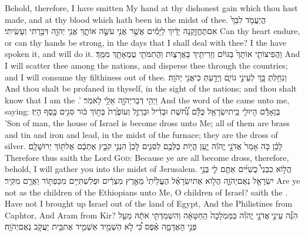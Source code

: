 {Behold, therefore, I have smitten My hand at thy dishonest gain which thou hast made, and at thy blood which hath been in the midst of thee.}
{הֲיַעֲמֹ֤ד לִבֵּךְ֙ אִם\maqqaf תֶּחֱזַ֣קְנָה יָדַ֔יִךְ לַיָּמִ֕ים אֲשֶׁ֥ר אֲנִ֖י עֹשֶׂ֣ה אוֹתָ֑ךְ אֲנִ֥י יְהֹוָ֖ה דִּבַּ֥רְתִּי וְעָשִֽׂיתִי׃}
{Can thy heart endure, or can thy hands be strong, in the days that I shall deal with thee? I the \lord\space have spoken it, and will do it.}
{וַהֲפִיצוֹתִ֤י אוֹתָךְ֙ בַּגּוֹיִ֔ם וְזֵרִיתִ֖יךְ בָּאֲרָצ֑וֹת וַהֲתִמֹּתִ֥י טֻמְאָתֵ֖ךְ מִמֵּֽךְ׃}
{And I will scatter thee among the nations, and disperse thee through the countries; and I will consume thy filthiness out of thee.}
{וְנִחַ֥לְתְּ בָּ֖ךְ לְעֵינֵ֣י גוֹיִ֑ם וְיָדַ֖עַתְּ כִּי\maqqaf אֲנִ֥י יְהֹוָֽה׃ \petucha }
{And thou shalt be profaned in thyself, in the sight of the nations; and thou shalt know that I am the \lord.’}
{וַיְהִ֥י דְבַר\maqqaf יְהֹוָ֖ה אֵלַ֥י לֵאמֹֽר׃}
{And the word of the \lord\space came unto me, saying:}
{בֶּן\maqqaf אָדָ֕ם הָיוּ\maqqaf לִ֥י בֵֽית\maqqaf יִשְׂרָאֵ֖ל  כֻּלָּ֡ם נְ֠חֹ֠שֶׁת וּבְדִ֨יל וּבַרְזֶ֤ל וְעוֹפֶ֙רֶת֙ בְּת֣וֹךְ כּ֔וּר סִגִ֥ים כֶּ֖סֶף הָיֽוּ׃ \setuma }
{’Son of man, the house of Israel is become dross unto Me; all of them are brass and tin and iron and lead, in the midst of the furnace; they are the dross of silver.}
{לָכֵ֗ן כֹּ֤ה אָמַר֙ אֲדֹנָ֣י יֱהֹוִ֔ה יַ֛עַן הֱי֥וֹת כֻּלְּכֶ֖ם לְסִגִ֑ים לָכֵן֙ הִנְנִ֣י קֹבֵ֣ץ אֶתְכֶ֔ם אֶל\maqqaf תּ֖וֹךְ יְרוּשָׁלָֽ͏ִם׃}
{Therefore thus saith the Lord \textsc{God}: Because ye are all become dross, therefore, behold, I will gather you into the midst of Jerusalem.}
\label{haft_30}
\setcounter{chap}{9}
\setcounter{verse}{7}
{הֲל֣וֹא כִבְנֵי֩ כֻשִׁיִּ֨ים אַתֶּ֥ם לִ֛י בְּנֵ֥י יִשְׂרָאֵ֖ל נְאֻם\maqqaf יְהֹוָ֑ה הֲל֣וֹא אֶת\maqqaf יִשְׂרָאֵ֗ל הֶעֱלֵ֙יתִי֙ מֵאֶ֣רֶץ מִצְרַ֔יִם וּפְלִשְׁתִּיִּ֥ים מִכַּפְתּ֖וֹר וַאֲרָ֥ם מִקִּֽיר׃}
{Are ye not as the children of the Ethiopians unto Me, O children of Israel? saith the \lord. Have not I brought up Israel out of the land of Egypt, And the Philistines from Caphtor, And Aram from Kir?}
{הִנֵּ֞ה עֵינֵ֣י \legarmeh  אֲדֹנָ֣י יֱהֹוִ֗ה בַּמַּמְלָכָה֙ הַֽחַטָּאָ֔ה וְהִשְׁמַדְתִּ֣י אֹתָ֔הּ מֵעַ֖ל פְּנֵ֣י הָאֲדָמָ֑ה אֶ֗פֶס כִּ֠י לֹ֣א הַשְׁמֵ֥יד אַשְׁמִ֛יד אֶת\maqqaf בֵּ֥ית יַעֲקֹ֖ב נְאֻם\maqqaf יְהֹוָֽה׃}

